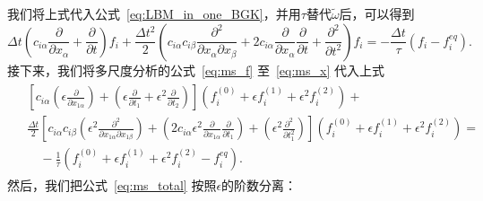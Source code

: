 我们将上式代入公式~\ref{eq:LBM_in_one_BGK}，并用$\tau$替代$\tilde{\omega}$后，可以得到
\begin{equation}
\Delta t\left({c}_{i \alpha} \frac{\partial}{\partial x_{\alpha}}+\frac{\partial}{\partial t}\right) f_{i}+\frac{\Delta t^{2}}{2}\left({c}_{i \alpha} {c}_{i \beta} \frac{\partial^{2}}{\partial x_{\alpha} \partial x_{\beta}}+2 {c}_{i \alpha} \frac{\partial}{\partial x_{\alpha}} \frac{\partial}{\partial t}+\frac{\partial^{2}}{\partial t^{2}}\right) f_{i}=-\frac{\Delta t}{\tau}\left(f_{i}-f_{i}^{e q}\right) .
\end{equation}
接下来，我们将多尺度分析的公式~\ref{eq:ms_f} 至~\ref{eq:ms_x} 代入上式
\begin{align}
    \begin{split}
& {\left[{c}_{i \alpha}\left(\epsilon \frac{\partial}{\partial x_{1 \alpha}}\right)+\left(\epsilon \frac{\partial}{\partial t_{1}}+\epsilon^{2} \frac{\partial}{\partial t_{2}}\right)\right]\left(f_{i}^{(0)}+\epsilon f_{i}^{(1)}+\epsilon^{2} f_{i}^{(2)}\right)+} \\
& \frac{\Delta t}{2}\left[{c}_{i \alpha} {c}_{i \beta}\left(\epsilon^{2} \frac{\partial^{2}}{\partial x_{1 \alpha} \partial x_{1 \beta}}\right)+\left(2 {c}_{i \alpha} \epsilon^{2} \frac{\partial}{\partial x_{1 \alpha}} \frac{\partial}{\partial t_{1}}\right)+\left(\epsilon^{2} \frac{\partial^{2}}{\partial t_{1}^{2}}\right)\right]\left(f_{i}^{(0)}+\epsilon f_{i}^{(1)}+\epsilon^{2} f_{i}^{(2)}\right)= \\
& \quad-\frac{1}{\tau}\left(f_{i}^{(0)}+\epsilon f_{i}^{(1)}+\epsilon^{2} f_{i}^{(2)}-f_{i}^{e q}\right) .
    \end{split}
    \label{eq:ms_total}
\end{align}
然后，我们把公式~\ref{eq:ms_total} 按照$\epsilon$的阶数分离：


